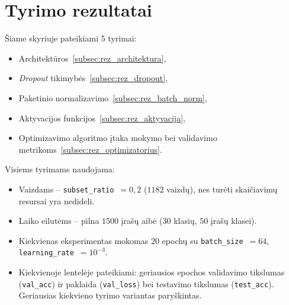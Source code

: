 \section{Tyrimo rezultatai}
\label{sec:tyrimo_rezultatai}

Šiame skyriuje pateikiami 5 tyrimai:
\begin{itemize}
    \item Architektūros~\ref{subsec:rez_architektura},
    \item \textit{Dropout} tikimybės~\ref{subsec:rez_dropout},
    \item Paketinio normalizavimo~\ref{subsec:rez_batch_norm},
    \item Aktyvacijos funkcijos~\ref{subsec:rez_aktyvacija},
    \item Optimizavimo algoritmo įtaka mokymo bei validavimo metrikoms~\ref{subsec:rez_optimizatorius}.
\end{itemize}
   Visiems tyrimams naudojama:
\begin{itemize}
    \item Vaizdams – \texttt{subset\_ratio}~$=0{,}2$ ($1182$ vaizdų), nes turėti skaičiavimų resursai yra nedideli.
    \item Laiko eilutėms – pilna $1500$ įrašų aibė ($30$ klasių, $50$ įrašų klasei).
    \item Kiekvienas eksperimentas mokomas $20$ epochų su \texttt{batch\_size}~$=64$, \texttt{learning\_rate}~$=10^{-3}$.
    \item Kiekvienoje lentelėje pateikiami: geriausios epochos validavimo tikslumas (\texttt{val\_acc}) ir paklaida (\texttt{val\_loss}) bei testavimo tikslumas (\texttt{test\_acc}). Geriausias kiekvieno tyrimo variantas paryškintas.
\end{itemize}






